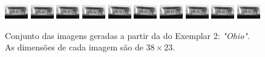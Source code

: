 \begin{figure}[H]
	\centering
	\caption{ Conjunto das imagens geradas a partir da do Exemplar 2: \emph{"Ohio"}.
	As dimensões de cada imagem são de $38 \times 23$.}
	\label{fig:frames2}
	\includegraphics{figures/degradedImg2/result-0.png}
	\includegraphics{figures/degradedImg2/result-1.png}
	\includegraphics{figures/degradedImg2/result-2.png}
	\includegraphics{figures/degradedImg2/result-3.png}
	\includegraphics{figures/degradedImg2/result-4.png}
	\includegraphics{figures/degradedImg2/result-5.png}
	\includegraphics{figures/degradedImg2/result-6.png}
	\includegraphics{figures/degradedImg2/result-7.png}
	\includegraphics{figures/degradedImg2/result-8.png}
	\includegraphics{figures/degradedImg2/result-9.png} 


\end{figure}
